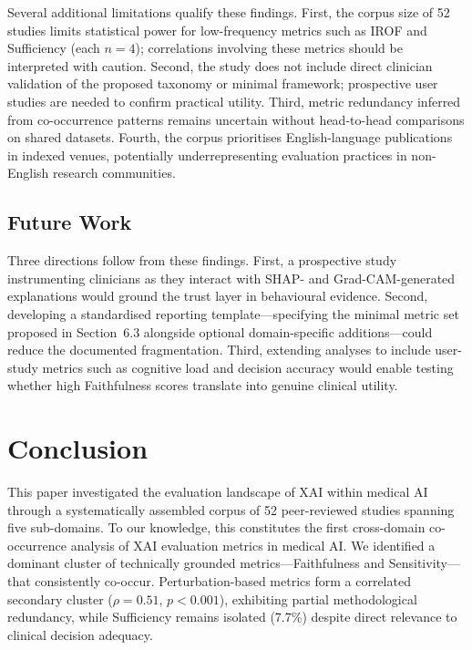Several additional limitations qualify these findings. First, the corpus size of 52 studies limits statistical power for low-frequency metrics such as IROF and Sufficiency (each $n = 4$); correlations involving these metrics should be interpreted with caution. Second, the study does not include direct clinician validation of the proposed taxonomy or minimal framework; prospective user studies are needed to confirm practical utility. Third, metric redundancy inferred from co-occurrence patterns remains uncertain without head-to-head comparisons on shared datasets. Fourth, the corpus prioritises English-language publications in indexed venues, potentially underrepresenting evaluation practices in non-English research communities.

\subsection{Future Work}

Three directions follow from these findings. First, a prospective study instrumenting clinicians as they interact with SHAP- and Grad-CAM-generated explanations would ground the trust layer in behavioural evidence. Second, developing a standardised reporting template---specifying the minimal metric set proposed in Section~6.3 alongside optional domain-specific additions---could reduce the documented fragmentation. Third, extending analyses to include user-study metrics such as cognitive load and decision accuracy would enable testing whether high Faithfulness scores translate into genuine clinical utility.


\section{Conclusion}

This paper investigated the evaluation landscape of XAI within medical AI through a systematically assembled corpus of 52 peer-reviewed studies spanning five sub-domains. To our knowledge, this constitutes the first cross-domain co-occurrence analysis of XAI evaluation metrics in medical AI. We identified a dominant cluster of technically grounded metrics---Faithfulness and Sensitivity---that consistently co-occur. Perturbation-based metrics form a correlated secondary cluster ($\rho = 0.51$, $p < 0.001$), exhibiting partial methodological redundancy, while Sufficiency remains isolated (7.7\%) despite direct relevance to clinical decision adequacy.

